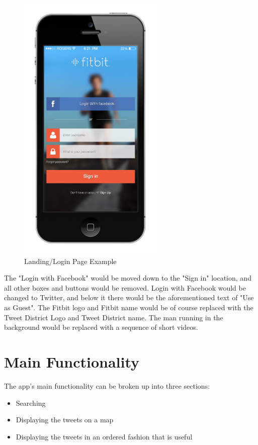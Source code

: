 \documentclass[11pt]{article}
\begin{document}
\begin{figure}[H]
    \centering
    \includegraphics[width=7cm]{loginIdea}
    \caption{Landing/Login Page Example}  
    \label{fig:loginMock}          
\end{figure}

The "Login with Facebook" would be moved down to the "Sign in" location, and all other boxes and buttons would be removed. Login with Facebook would be changed to Twitter, and below it there would be the aforementioned text of "Use as Guest". The Fitbit logo and Fitbit name would be of course replaced with the Tweet District Logo and Tweet District name. The man running in the background would be replaced with a sequence of short videos.

\section{Main Functionality}
The app's main functionality can be broken up into three sections:
\begin{itemize}
\item Searching
\item Displaying the tweets on a map
\item Displaying the tweets in an ordered fashion that is useful
\end{itemize}
\end{document}

